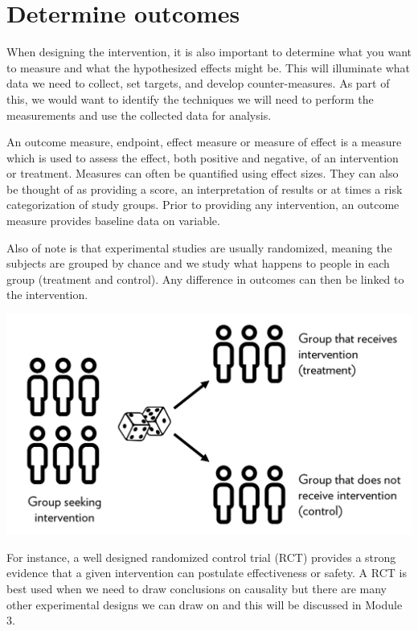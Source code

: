 \documentclass[]{book}
\begin{document}
\hypertarget{determine-outcomes}{%
\section{Determine outcomes}\label{determine-outcomes}}

When designing the intervention, it is also important to determine what you want to measure and what the hypothesized effects might be. This will illuminate what data we need to collect, set targets, and develop counter-measures. As part of this, we would want to identify the techniques we will need to perform the measurements and use the collected data for analysis.

An outcome measure, endpoint, effect measure or measure of effect is a measure which is used to assess the effect, both positive and negative, of an intervention or treatment. Measures can often be quantified using effect sizes. They can also be thought of as providing a score, an interpretation of results or at times a risk categorization of study groups. Prior to providing any intervention, an outcome measure provides baseline data on variable.

Also of note is that experimental studies are usually randomized, meaning the subjects are grouped by chance and we study what happens to people in each group (treatment and control). Any difference in outcomes can then be linked to the intervention.

\includegraphics{fig/RCT-graphic.png}

For instance, a well designed randomized control trial (RCT) provides a strong evidence that a given intervention can postulate effectiveness or safety. A RCT is best used when we need to draw conclusions on causality but there are many other experimental designs we can draw on and this will be discussed in Module 3.
\end{document}
